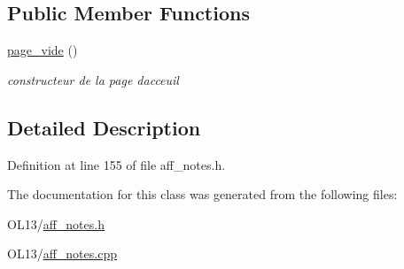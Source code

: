 \subsection*{Public Member Functions}
\begin{DoxyCompactItemize}
\item 
\mbox{\label{classpage__vide_a179cdfb1ca970cd7276b7e7d640ad182}} 
\hyperlink{classpage__vide_a179cdfb1ca970cd7276b7e7d640ad182}{page\+\_\+vide} ()
\begin{DoxyCompactList}\small\item\em constructeur de la page d\textquotesingle{}acceuil \end{DoxyCompactList}\end{DoxyCompactItemize}


\subsection{Detailed Description}


Definition at line 155 of file aff\+\_\+notes.\+h.



The documentation for this class was generated from the following files\+:\begin{DoxyCompactItemize}
\item 
O\+L13/\hyperlink{aff__notes_8h}{aff\+\_\+notes.\+h}\item 
O\+L13/\hyperlink{aff__notes_8cpp}{aff\+\_\+notes.\+cpp}\end{DoxyCompactItemize}
